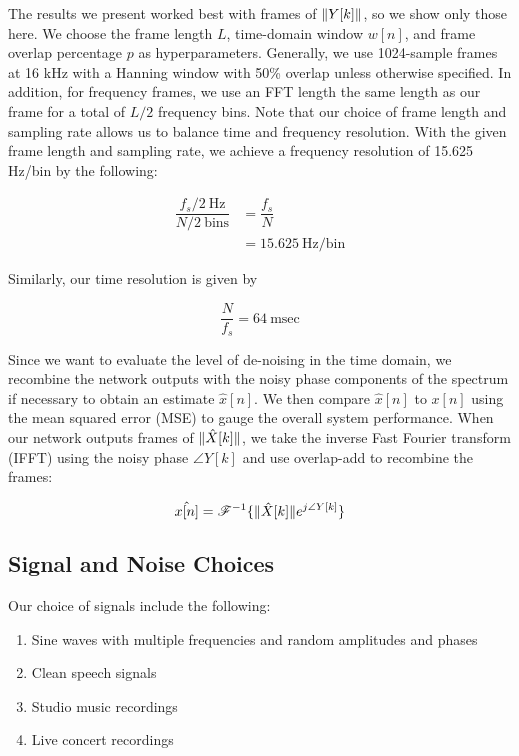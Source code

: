 The results we present worked best with frames of $\lVert Y[k]\rVert$, so we show only those here. We choose the frame length $L$, time-domain window $w[n]$, and frame overlap percentage $p$ as hyperparameters. Generally, we use 1024-sample frames at 16 kHz with a Hanning window with 50\% overlap unless otherwise specified. In addition, for frequency frames, we use an FFT length the same length as our frame for a total of $L/2$ frequency bins. Note that our choice of frame length and sampling rate allows us to balance time and frequency resolution. With the given frame length and sampling rate, we achieve a frequency resolution of 15.625 Hz/bin by the following:

\begin{align}
\dfrac{f_s/2 \:\text{Hz}}{N/2 \:\text{bins}} &= \dfrac{f_s}{N}\\
&= 15.625 \:\text{Hz/bin}
\end{align}

Similarly, our time resolution is given by

\begin{equation}
\dfrac{N}{f_s} = 64 \:\text{msec}
\end{equation}

Since we want to evaluate the level of de-noising in the time domain, we recombine the network outputs with the noisy phase components of the spectrum if necessary to obtain an estimate $\hat{x}[n]$. We then compare $\hat{x}[n]$ to $x[n]$ using the mean squared error (MSE) to gauge the overall system performance. When our network outputs frames of $\lVert\hat{X}[k]\rVert$, we take the inverse Fast Fourier transform (IFFT) using the noisy phase $\angle{Y[k]}$ and use overlap-add to recombine the frames:

\begin{equation}
\hat{x[n]} = \mathscr{F}^{-1} \{ \lVert\hat{X}[k]\rVert e^{j \angle{Y[k]}} \}
\end{equation}

\subsection{Signal and Noise Choices}
Our choice of signals include the following:

\begin{enumerate}
    \item Sine waves with multiple frequencies and random amplitudes and phases
    \item Clean speech signals
    \item Studio music recordings
    \item Live concert recordings
\end{enumerate}

